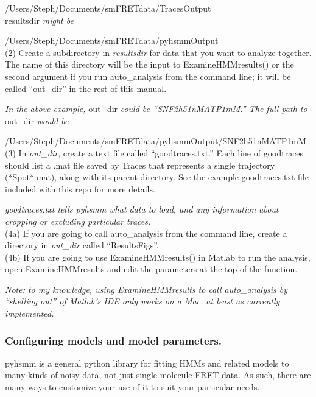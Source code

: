 \documentclass[11pt]{article}
\begin{document}
/Users/Steph/Documents/smFRETdata/TracesOutput \\
\noindent resultsdir {\it might be}

/Users/Steph/Documents/smFRETdata/pyhsmmOutput\\

\noindent (2) Create a subdirectory in {\it resultsdir} for data that you want to analyze together. The name of this directory will be the input to ExamineHMMresults() or the second argument if you run auto\_analysis from the command line; it will be called ``out\_dir'' in the rest of this manual.

{\it In the above example,} out\_dir {\it could be ``SNF2h51nMATP1mM.'' The full path to} out\_dir {\it would be}

/Users/Steph/Documents/smFRETdata/pyhsmmOutput/SNF2h51nMATP1mM\\

\noindent (3) In {\it out\_dir}, create a text file called ``goodtraces.txt.'' Each line of goodtraces should list a .mat file saved by Traces that represents a single trajectory (*Spot*.mat), along with its parent directory. See the example goodtraces.txt file included with this repo for more details. 

{\it goodtraces.txt tells pyhsmm what data to load, and any information about cropping or excluding particular traces.}\\

\noindent (4a) If you are going to call auto\_analysis from the command line, create a directory in {\it out\_dir} called ``ResultsFigs''.\\

\noindent (4b) If you are going to use ExamineHMMresults() in Matlab to run the analysis, open ExamineHMMresults and edit the parameters at the top of the function.

{\it Note: to my knowledge, using ExamineHMMresults to call auto\_analysis by ``shelling out'' of Matlab's IDE only works on a Mac, at least as currently implemented.}

\subsubsection{Configuring models and model parameters.}

pyhsmm is a general python library for fitting HMMs and related models to many kinds of noisy data, not just single-molecule FRET data. As such, there are many ways to customize your use of it to suit your particular needs.
\end{document}
